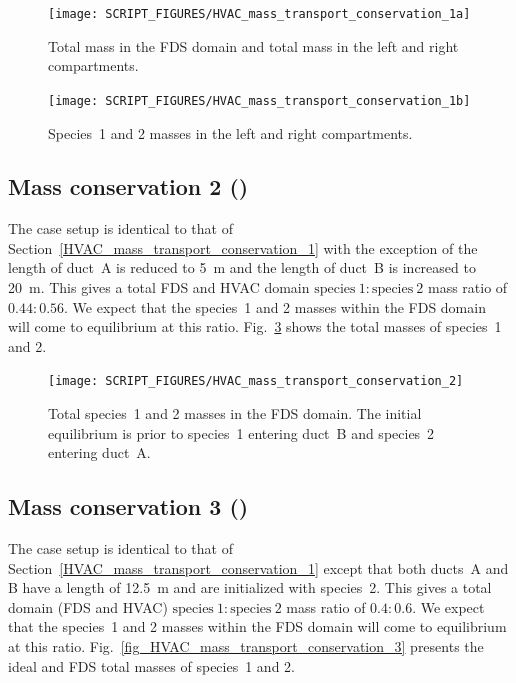 \documentclass[11pt]{book}
\begin{document}
\begin{figure}[ht]
\centering
\texttt{[image: SCRIPT\_FIGURES/HVAC\_mass\_transport\_conservation\_1a]}
\caption[ test case]{Total mass in the FDS domain and total mass in the left and right compartments.}
\label{fig_HVAC_mass_transport_conservation_1a}
\end{figure}

\begin{figure}[ht]
\centering
\texttt{[image: SCRIPT\_FIGURES/HVAC\_mass\_transport\_conservation\_1b]}
\caption[ test case]{Species~1 and 2 masses in the left and right compartments.}
\label{fig_HVAC_mass_transport_conservation_1b}
\end{figure}

\subsection{Mass conservation 2 (\texorpdfstring{}{HVAC\_mass\_transport\_conservation\_2})}
\label{HVAC_mass_transport_conservation_2}
The case setup is identical to that of Section~\ref{HVAC_mass_transport_conservation_1} with the exception of the length of duct~A is reduced to \SI{5}{\meter} and the length of duct~B is increased to \SI{20}{\meter}. This gives a total FDS and HVAC domain \(\text{species}\ 1 \colon \text{species}\ 2\) mass ratio of \(0.44 \colon 0.56\). We expect that the species~1 and 2 masses within the FDS domain will come to equilibrium at this ratio. Fig.~\ref{fig_HVAC_mass_transport_conservation_2} shows the total masses of species~1 and 2.

\begin{figure}[ht]
\centering
\texttt{[image: SCRIPT\_FIGURES/HVAC\_mass\_transport\_conservation\_2]}
\caption[ test case]{Total species~1 and 2 masses in the FDS domain. The initial equilibrium is prior to species~1 entering duct~B and species~2 entering duct~A.}
\label{fig_HVAC_mass_transport_conservation_2}
\end{figure}

\subsection{Mass conservation 3 (\texorpdfstring{}{HVAC\_mass\_transport\_conservation\_3})}
\label{HVAC_mass_transport_conservation_3}
The case setup is identical to that of Section~\ref{HVAC_mass_transport_conservation_1} except that both ducts~A and B have a length of \SI{12.5}{\meter} and are initialized with species~2. This gives a total domain (FDS and HVAC) \(\text{species}\ 1 \colon \text{species}\ 2\) mass ratio of \(0.4 \colon 0.6\). We expect that the species~1 and 2 masses within the FDS domain will come to equilibrium at this ratio. Fig.~\ref{fig_HVAC_mass_transport_conservation_3} presents the ideal and FDS total masses of species~1 and 2.
\end{document}
